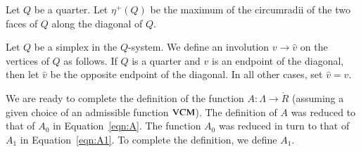 \begin{definition}[$\eta^+(Q)$]
Let $Q$ be a quarter.   Let $\eta^+(Q)$ be the maximum of the
circumradii of the two faces of $Q$ along the diagonal of $Q$.
\end{definition}

Let $Q$ be a simplex in the $Q$-system.  We define an involution
$v\to \hat v$ on the vertices of $Q$ as follows.  If $Q$ is a
quarter and $v$ is an endpoint of the diagonal, then let $\hat v$
be the opposite endpoint of the diagonal.  In all other cases, set
$\hat v = v$.

We are ready to complete the definition of the function
$A:\Lambda\to\ring{R}$ (assuming a given choice of an admissible
function ${\operatorname{VCM}}$). The definition of $A$ was reduced to that of
$A_0$ in Equation~\ref{eqn:A}.  The function $A_0$ was reduced in
turn to that of $A_1$ in Equation~\ref{eqn:A1}. To complete the
definition, we define $A_1$.

